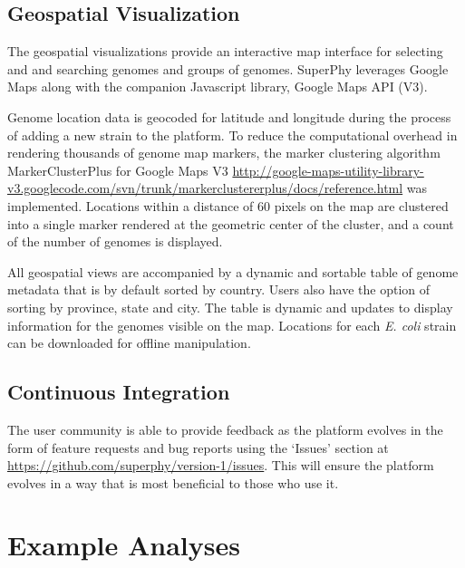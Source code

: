 \documentclass[doublespacing, linenumbers]{bmcart}
\begin{document}
\subsection{Geospatial Visualization}
The geospatial visualizations provide an interactive map interface for selecting and and searching genomes and groups of genomes. SuperPhy leverages Google Maps along with the companion Javascript library, Google Maps API (V3).

Genome location data is geocoded for latitude and longitude during the process of adding a new strain to the platform. To reduce the computational overhead in  rendering thousands of genome map markers, the marker clustering algorithm MarkerClusterPlus for Google Maps V3 \url{http://google-maps-utility-library-v3.googlecode.com/svn/trunk/markerclustererplus/docs/reference.html} was implemented. Locations within a distance of 60 pixels on the map are clustered into a single marker rendered at the geometric center of the cluster, and a count of the number of genomes is displayed. 

All geospatial views are accompanied by a dynamic and sortable table of genome metadata that is by default sorted by country. Users also have the option of sorting by province, state and city. The table is dynamic and updates to display information for the genomes visible on the map. Locations for each \textit{E. coli} strain can be downloaded for offline manipulation.

\subsection{Continuous Integration}
The user community is able to provide feedback as the platform evolves in the form of feature requests and bug reports using the `Issues' section at \url{https://github.com/superphy/version-1/issues}.  This will ensure the platform evolves in a way that is most beneficial to those who use it.


\section{Example Analyses}
\end{document}
